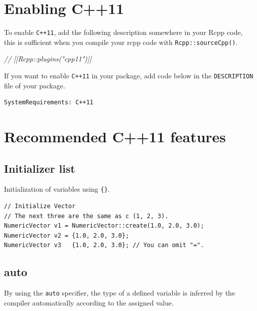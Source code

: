\documentclass[
]{book}
\newenvironment{Shaded}{\begin{snugshade}}{\end{snugshade}}
\newcommand{\CommentTok}[1]{\textcolor[rgb]{0.56,0.35,0.01}{\textit{#1}}}
\begin{document}
\hypertarget{enabling-c11}{%
\section{Enabling C++11}\label{enabling-c11}}

To enable \texttt{C++11}, add the following description somewhere in your Rcpp code, this is sufficient when you compile your rcpp code with \texttt{Rcpp::sourceCpp()}.

\begin{Shaded}
\begin{Highlighting}[]
\CommentTok{// [[Rcpp::plugins("cpp11")]]}
\end{Highlighting}
\end{Shaded}

If you want to enable \texttt{C++11} in your package, add code below in the \texttt{DESCRIPTION} file of your package.

\begin{verbatim}
SystemRequirements: C++11
\end{verbatim}

\hypertarget{recommended-c11-features}{%
\section{Recommended C++11 features}\label{recommended-c11-features}}

\hypertarget{initializer-list}{%
\subsection{Initializer list}\label{initializer-list}}

Initialization of variables using \texttt{\{\}}.

\begin{verbatim}
// Initialize Vector
// The next three are the same as c (1, 2, 3).
NumericVector v1 = NumericVector::create(1.0, 2.0, 3.0);
NumericVector v2 = {1.0, 2.0, 3.0};
NumericVector v3   {1.0, 2.0, 3.0}; // You can omit "=".
\end{verbatim}

\hypertarget{auto}{%
\subsection{auto}\label{auto}}

By using the \texttt{auto} specifier, the type of a defined variable is inferred by the compiler automatically according to the assigned value.
\end{document}
